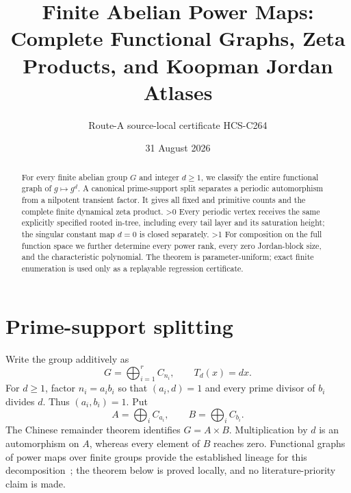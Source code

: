 \documentclass[10pt]{article}
\title{Finite Abelian Power Maps:\\Complete Functional Graphs, Zeta Products, and Koopman Jordan Atlases}
\author{Route-A source-local certificate HCS-C264}
\date{31 August 2026}
\providecommand{\CRevisionRound}{2}
\begin{document}
\maketitle
\begin{abstract}
For every finite abelian group $G$ and integer $d\geq1$, we classify the
entire functional graph of $g\mapsto g^d$.  A canonical prime-support split
separates a periodic automorphism from a nilpotent transient factor.  It gives
all fixed and primitive counts and the complete finite dynamical zeta product.
\ifnum\CRevisionRound>0
Every periodic vertex receives the same explicitly specified rooted in-tree,
including every tail layer and its saturation height; the singular constant
map $d=0$ is closed separately.
\fi
\ifnum\CRevisionRound>1
For composition on the full function space we further determine every power
rank, every zero Jordan-block size, and the characteristic polynomial.
\fi
The theorem is parameter-uniform; exact finite enumeration is used only as a
replayable regression certificate.
\end{abstract}

\section{Prime-support splitting}
Write the group additively as
\[
 G=\bigoplus_{i=1}^r C_{n_i},\qquad T_d(x)=dx.
\]
For $d\geq1$, factor $n_i=a_i b_i$ so that $(a_i,d)=1$ and every prime
divisor of $b_i$ divides $d$.  Thus $(a_i,b_i)=1$.  Put
\[
 A=\bigoplus_i C_{a_i},\qquad B=\bigoplus_i C_{b_i}.
\]
The Chinese remainder theorem identifies $G=A\times B$.  Multiplication by
$d$ is an automorphism on $A$, whereas every element of $B$ reaches zero.
Functional graphs of power maps over finite groups provide the established
lineage for this decomposition~\cite{QR}; the theorem below is proved locally,
and no literature-priority claim is made.
\end{document}
